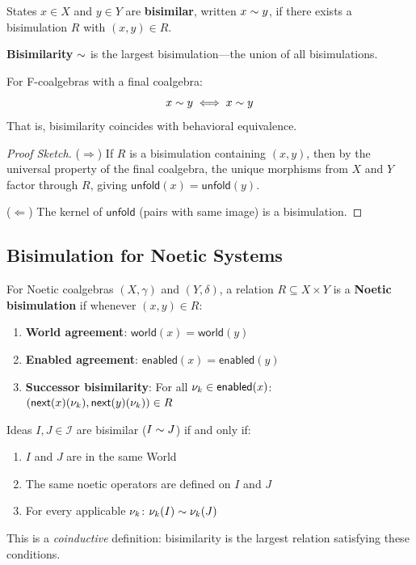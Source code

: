 \begin{definition}[Bisimilarity]
\label{def:bisimilarity}
States $x \in X$ and $y \in Y$ are \textbf{bisimilar}, written $x \sim y$, if
there exists a bisimulation $R$ with $(x, y) \in R$.

\textbf{Bisimilarity} $\sim$ is the largest bisimulation---the union of all bisimulations.
\end{definition}

\begin{theorem}
\label{thm:bisim-behavioral}
For F-coalgebras with a final coalgebra:
\[
  x \sim y \iff x \sim y
\]
That is, bisimilarity coincides with behavioral equivalence.
\end{theorem}

\begin{proof}[Proof Sketch]
($\Rightarrow$) If $R$ is a bisimulation containing $(x,y)$, then by the universal
property of the final coalgebra, the unique morphisms from $X$ and $Y$ factor through
$R$, giving $\mathsf{unfold}(x) = \mathsf{unfold}(y)$.

($\Leftarrow$) The kernel of $\mathsf{unfold}$ (pairs with same image) is a bisimulation.
\end{proof}

\subsection{Bisimulation for Noetic Systems}
\label{subsec:bisim-noetic}

\begin{definition}
\label{def:noetic-bisimulation}
For Noetic coalgebras $(X, \gamma)$ and $(Y, \delta)$, a relation $R \subseteq X \times Y$
is a \textbf{Noetic bisimulation} if whenever $(x, y) \in R$:
\begin{enumerate}[label=(\roman*)]
  \item \textbf{World agreement}: $\mathsf{world}(x) = \mathsf{world}(y)$
  \item \textbf{Enabled agreement}: $\mathsf{enabled}(x) = \mathsf{enabled}(y)$
  \item \textbf{Successor bisimilarity}: For all $\nu_{k} \in \mathsf{enabled}(x)$:
        $(\mathsf{next}(x)(\nu_{k}), \mathsf{next}(y)(\nu_{k})) \in R$
\end{enumerate}
\end{definition}

\begin{proposition}
\label{prop:noetic-bisim-char}
Ideas $I, J \in \mathcal{I}$ are bisimilar ($I \sim J$) if and only if:
\begin{enumerate}[label=(\alph*)]
  \item $I$ and $J$ are in the same World
  \item The same noetic operators are defined on $I$ and $J$
  \item For every applicable $\nu_{k}$: $\nu_{k}(I) \sim \nu_{k}(J)$
\end{enumerate}
This is a \emph{coinductive} definition: bisimilarity is the largest relation
satisfying these conditions.
\end{proposition}

